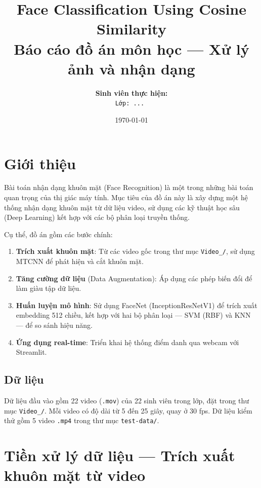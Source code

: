 \documentclass[12pt,a4paper]{article}
\title{\textbf{Face Classification Using Cosine Similarity}\\[0.5cm]
\large{Báo cáo đồ án môn học --- Xử lý ảnh và nhận dạng}}
\author{
    \textbf{Sinh viên thực hiện:} \\
    \texttt{Lớp: ... }
}
\date{\today}
\begin{document}
\maketitle
\thispagestyle{empty}
\newpage

\tableofcontents
\newpage

\section{Giới thiệu}
\label{sec:intro}

Bài toán nhận dạng khuôn mặt (Face Recognition) là một trong những bài toán quan trọng của thị giác máy tính. Mục tiêu của đồ án này là xây dựng một hệ thống nhận dạng khuôn mặt từ dữ liệu video, sử dụng các kỹ thuật học sâu (Deep Learning) kết hợp với các bộ phân loại truyền thống.

Cụ thể, đồ án gồm các bước chính:
\begin{enumerate}
    \item \textbf{Trích xuất khuôn mặt}: Từ các video gốc trong thư mục \texttt{Video\_/}, sử dụng MTCNN để phát hiện và cắt khuôn mặt.
    \item \textbf{Tăng cường dữ liệu} (Data Augmentation): Áp dụng các phép biến đổi để làm giàu tập dữ liệu.
    \item \textbf{Huấn luyện mô hình}: Sử dụng FaceNet (InceptionResNetV1) để trích xuất embedding 512 chiều, kết hợp với hai bộ phân loại --- SVM (RBF) và KNN --- để so sánh hiệu năng.
    \item \textbf{Ứng dụng real-time}: Triển khai hệ thống điểm danh qua webcam với Streamlit.
\end{enumerate}

\subsection{Dữ liệu}
\label{subsec:data}

Dữ liệu đầu vào gồm 22 video (\texttt{.mov}) của 22 sinh viên trong lớp, đặt trong thư mục \texttt{Video\_/}. Mỗi video có độ dài từ 5 đến 25 giây, quay ở 30 fps. Dữ liệu kiểm thử gồm 5 video \texttt{.mp4} trong thư mục \texttt{test-data/}.

\newpage

\section{Tiền xử lý dữ liệu --- Trích xuất khuôn mặt từ video}
\label{sec:extract}
\end{document}
